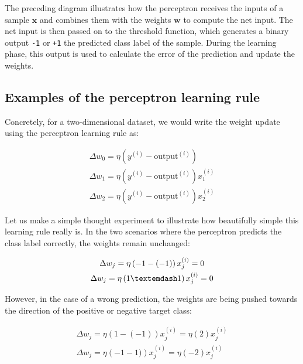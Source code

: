 \documentclass[11pt]{article}
\newcommand{\vect}[1]{\boldsymbol{#1}}
\begin{document}
    The preceding diagram illustrates how the perceptron receives the inputs of a sample $\vect{x}$ and combines them with the weights $\vect{w}$ to compute the net input.
    The net input is then passed on to the threshold function, which generates a binary output \texttt{-1} or \texttt{+1} \textemdash the predicted class label of the sample.
    During the learning phase, this output is used to calculate the error of the prediction and update the weights.

    \subsection{Examples of the perceptron learning rule} \label{subsec:perc_examples}

    Concretely, for a two-dimensional dataset, we would write the weight update using the perceptron learning rule as:

    \begin{equation}
        \label{eq:perc_2var_wupdate}
        \begin{gathered}
            \Delta w_0 = \eta \left( y^{(i)} - \text{output}^{(i)} \right) \\
            \Delta w_1 = \eta \left( y^{(i)} - \text{output}^{(i)} \right) x_1^{(i)} \\
            \Delta w_2 = \eta \left( y^{(i)} - \text{output}^{(i)} \right) x_2^{(i)}
        \end{gathered}
    \end{equation}

    Let us make a simple thought experiment to illustrate how beautifully simple this learning rule really is.
    In the two scenarios where the perceptron predicts the class label correctly, the weights remain unchanged:

    \begin{equation}
        \label{perc_correct}
        \begin{gathered}
            \Delta w_j = \eta \left( -1 - (-1) \right) x_j^{(i)} = 0\\
            \Delta w_j = \eta \left( 1 \textemdash 1 \right) x_j^{(i)} = 0
        \end{gathered}
    \end{equation}

    However, in the case of a wrong prediction, the weights are being pushed towards the direction of the positive or negative target class:

    \begin{equation}
        \label{perc_incorrect}
        \begin{gathered}
            \Delta w_j = \eta \left( 1 - (-1) \right) x_j^{(i)} = \eta \left( 2 \right) x_j^{(i)} \\
            \Delta w_j = \eta \left( -1 - 1) \right) x_j^{(i)} = \eta \left( - 2 \right) x_j^{(i)}
        \end{gathered}
    \end{equation}
\end{document}
